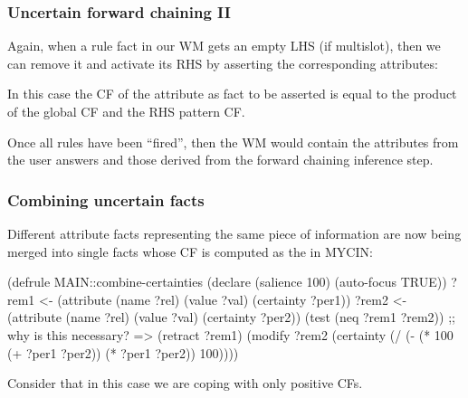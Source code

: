\documentclass[xcolor={usenames,dvipsnames,svgnames}, compress]{beamer}
\begin{document}
\begin{frame}[fragile]
  \frametitle{Uncertain forward chaining II}

  Again, when a rule fact in our WM gets an empty LHS (\textsf{if}
  multislot), then we can remove it and activate its RHS by asserting
  the corresponding attributes:\par\bigskip
  \bigskip

  In this case the CF of the attribute as fact to be asserted is
  equal to the product of the global CF and the RHS pattern
  CF.\par

  Once all rules have been ``fired'', then the WM would contain the
  attributes from the user answers and those derived from
  the forward chaining inference step.
  
\end{frame}

\begin{frame}[fragile]
  \frametitle{Combining uncertain facts}

  Different attribute facts representing the same piece of information are now
  being merged into single facts whose CF is computed as the in MYCIN:\par\bigskip
  \begin{clips-code}[numbers=none]
    (defrule MAIN::combine-certainties
        (declare (salience 100)
        (auto-focus TRUE))
        ?rem1 <- (attribute (name ?rel) (value ?val) (certainty ?per1))
        ?rem2 <- (attribute (name ?rel) (value ?val) (certainty ?per2))
        (test (neq ?rem1 ?rem2)) ;; why is this necessary?
        =>
        (retract ?rem1)
        (modify ?rem2 (certainty (/ (- (* 100 (+ ?per1 ?per2))
                                       (* ?per1 ?per2)) 100))))
  \end{clips-code}
Consider that in this case we are coping with only positive CFs.      
\end{frame}
\end{document}
